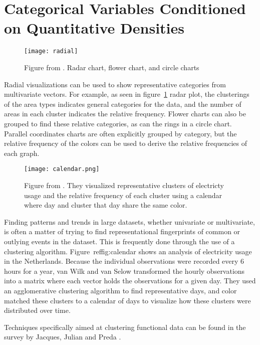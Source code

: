 \section{Categorical Variables Conditioned on Quantitative Densities}  


\begin{figure}
\texttt{[image: radial]}
\caption{Figure from \cite{albo_off_2016}. Radar chart, flower chart, and circle
  charts}
\label{fig:radial}
\end{figure}
Radial visualizations can be used to show representative
categories from multivariate vectors. For example, as seen in figure~\ref{fig:radial}
radar plot, the clusterings of the area types indicates general categories for
the data, and the number of areas in each cluster indicates the relative
frequency. Flower charts can also be grouped to find these relative
categories, as can the rings in a circle chart. Parallel coordinates charts are often explicitly grouped by category, but the relative frequency of the colors can be used to derive the relative frequencies of each graph. 

\begin{figure}
\texttt{[image: calendar.png]}
\caption{Figure from \cite{van_wijk_cluster_1999}. They visualized representative clusters of electricty usage and the relative frequency of each cluster using a calendar where day and cluster that day share the same color.}
\label{fig:calendar}
\end{figure}

Finding patterns and trends in large datasets, whether univariate or multivariate, is often a matter of trying to find representational fingerprints of common or outlying events in the dataset. This is frequently done through the use of a clustering algorithm. Figure~ref{fig:calendar} shows an analysis of electricity usage in the Netherlands\cite{van_wijk_cluster_1999}. Because the individual observations were recorded every 6 hours for a year, van Wilk and van Selow transformed the hourly observations into a matrix where each vector holds the observations for a given day. They used an agglomerative clustering algorithm \cite{kaufman_agglomerative_1990} to find representative days, and color matched these clusters to a calendar of days to visualize how these clusters were distributed over time. 

Techniques specifically aimed at clustering functional data can be found in the survey by Jacques, Julian and Preda \cite{Jacques_functional_2014}. %
